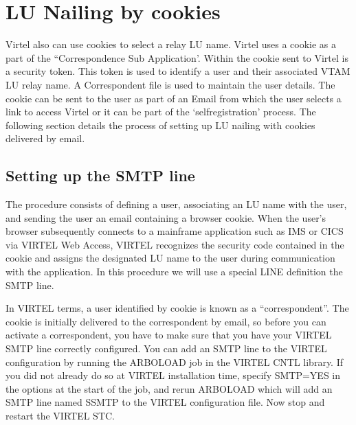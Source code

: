 \documentclass[letterpaper,10pt,english]{sphinxmanual}
\begin{document}
\newpage

\ignorespaces 

\section{LU Nailing by cookies}
\label{\detokenize{connectivity_guide:lu-nailing-by-cookies}}\label{\detokenize{connectivity_guide:index-156}}
\sphinxAtStartPar
Virtel also can use cookies to select a relay LU name. Virtel uses a cookie as a part of the “Correspondence Sub Application’. Within the cookie sent to Virtel is a security token. This token is used to identify a user and their associated VTAM LU relay name. A Correspondent file is used to maintain the user details. The cookie can be sent to the user as part of an Email from which the user selects a link to access Virtel or it can be part of the ‘self\sphinxhyphen{}registration’ process. The following section details the process of setting up LU nailing with cookies delivered by email.


\subsection{Setting up the SMTP line}
\label{\detokenize{connectivity_guide:setting-up-the-smtp-line}}
\sphinxAtStartPar
The procedure consists of defining a user, associating an LU name with the user, and sending the user an e\sphinxhyphen{}mail containing a browser cookie.  When the user’s browser subsequently connects to a mainframe application such as IMS or CICS via VIRTEL Web Access, VIRTEL recognizes the security code contained in the cookie and assigns the designated LU name to the user during communication with the application. In this procedure we will use a special LINE definition \sphinxhyphen{} the SMTP line.

\sphinxAtStartPar
In VIRTEL terms, a user identified by cookie is known as a “correspondent”.  The cookie is initially delivered to the correspondent by e\sphinxhyphen{}mail, so before you can activate a correspondent, you have to make sure that you have your VIRTEL SMTP line correctly configured. You can add an SMTP line to the VIRTEL configuration by running the ARBOLOAD job in the VIRTEL CNTL library. If you did not already do so at VIRTEL installation time, specify SMTP=YES in the options at the start of the job, and rerun ARBOLOAD which will add an SMTP line named S\sphinxhyphen{}SMTP to the VIRTEL configuration file.  Now stop and restart the VIRTEL STC.
\end{document}
